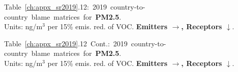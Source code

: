 \footnotesize{\mbox{Table \ref{ch:appx_sr2019}.12: 2019 country-to-country blame matrices for \textbf{PM2.5}.}\\ Units: ng/m$^3$ per 15\% emis. red. of VOC. \textbf{Emitters $\rightarrow$, Receptors $\downarrow$}. }\\[\baselineskip]\enlargethispage{\myenlarge} \hspace{-0.5cm} 
\centerline{}\clearpage
\footnotesize{\mbox{Table \ref{ch:appx_sr2019}.12 Cont.: 2019 country-to-country blame matrices for \textbf{PM2.5}.}\\ Units: ng/m$^3$ per 15\% emis. red. of VOC. \textbf{Emitters $\rightarrow$, Receptors $\downarrow$}. }\\[\baselineskip]\enlargethispage{\myenlarge} \hspace{-0.5cm} 
\centerline{}\clearpage




